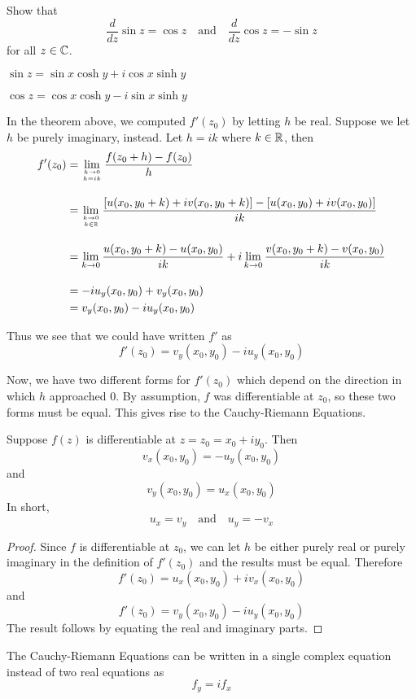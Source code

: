 \documentclass[handout]{ximera}
\begin{document}
\begin{problem}
Show that
\[
\frac{d}{dz} \sin z = \cos z \quad \mbox{and} \quad \frac{d}{dz} \cos z = -\sin z
\]
for all $z \in \mathbb C$.
\begin{hint}
$\sin z = \sin x \cosh y + i \cos x \sinh y$
\end{hint}
\begin{hint}
$\cos z = \cos x \cosh y - i \sin x \sinh y$
\end{hint}
\end{problem}

In the theorem above, we computed $f'(z_0)$ by letting $h$ be real.  Suppose we let $h$ be purely imaginary, instead.
Let $h = ik$ where $k \in \mathbb R$, then
\begin{align*}
f'(z_0) &= \lim_{h \to 0 \atop h = ik} \frac{f(z_0 + h) -f(z_0)}{h} \\[10pt]
        &= \lim_{k \to 0 \atop k \in \mathbb R} \frac{\left[u(x_0 , y_0+k) + iv(x_0 , y_0+k)\right] - \left[u(x_0,y_0)+iv(x_0, y_0)\right]}{ik} \\[10pt]
        &=  \lim_{k \to 0} \frac{u(x_0 , y_0+k)- u(x_0,y_0)}{ik} +i\lim_{k \to 0}\frac{v(x_0 , y_0+k)-v(x_0, y_0)}{ik} \\[10pt]
        &= -iu_y(x_0,y_0) + v_y(x_0,y_0)\\
        &=  v_y(x_0,y_0)-iu_y(x_0,y_0)
\end{align*}

Thus we see that we could have written $f'$ as
\[
f'(z_0) = v_y(x_0,y_0)-iu_y(x_0,y_0)
\]

Now, we have two different forms for $f'(z_0)$ which depend on the direction in which $h$ approached $0$.
By assumption, $f$ was differentiable at $z_0$, so these two forms must be equal. This gives rise to the Cauchy-Riemann Equations.
\begin{theorem}
Suppose $f(z)$ is differentiable at $z = z_0 = x_0 +iy_0$. Then
\[
v_x(x_0,y_0)= -u_y(x_0,y_0) 
\]
and 
\[
v_y(x_0,y_0) = u_x(x_0,y_0)
\]
In short, 
\[
u_x =v_y \quad \mbox{and} \quad u_y = -v_x
\]
\end{theorem}
\begin{proof}
Since $f$ is differentiable at $z_0$, we can let $h$ be either purely real or purely imaginary in the definition of $f'(z_0)$
and the results must be equal. Therefore
\[
f'(z_0) = u_x(x_0,y_0)+iv_x(x_0,y_0)
\]
and
\[
f'(z_0) = v_y(x_0,y_0)-iu_y(x_0,y_0)
\]
The result follows by equating the real and imaginary parts.
\end{proof}
\begin{remark}
The Cauchy-Riemann Equations can be written in a single complex equation instead of two real equations as
\[
f_y = if_x
\]
\end{remark}
\end{document}
